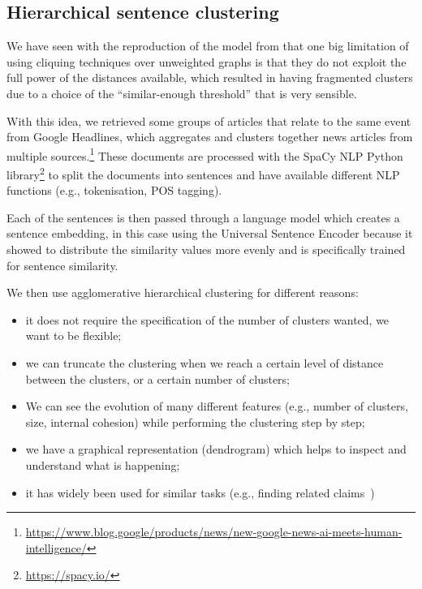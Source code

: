 
\subsection{Hierarchical sentence clustering}
\label{sec:cgs_clustering_and_differences_hierarchical}


We have seen with the reproduction of the model from \citet{bountouridis2018explaining} that one big limitation of using cliquing techniques over unweighted graphs is that they do not exploit the full power of the distances available, which resulted in having fragmented clusters due to a choice of the ``similar-enough threshold'' that is very sensible.

With this idea, we retrieved some groups of articles that relate to the same event from Google Headlines, which aggregates and clusters together news articles from multiple sources.\footnote{\url{https://www.blog.google/products/news/new-google-news-ai-meets-human-intelligence/}}
These documents are processed with the SpaCy NLP Python library\footnote{\url{https://spacy.io/}} to split the documents into sentences and have available different NLP functions (e.g., tokenisation, POS tagging).

Each of the sentences is then passed through a language model which creates a sentence embedding, in this case using the Universal Sentence Encoder because it showed to distribute the similarity values more evenly and is specifically trained for sentence similarity.

We then use agglomerative hierarchical clustering for different reasons:
\begin{itemize}
    \item it does not require the specification of the number of clusters wanted, we want to be flexible;
    \item we can truncate the clustering when we reach a certain level of distance between the clusters, or a certain number of clusters;
    \item We can see the evolution of many different features (e.g., number of clusters, size, internal cohesion) while performing the clustering step by step;
    \item we have a graphical representation (dendrogram) which helps to inspect and understand what is happening;
    \item it has widely been used for similar tasks (e.g., finding related claims~\citep{almeida2020text})
\end{itemize}

